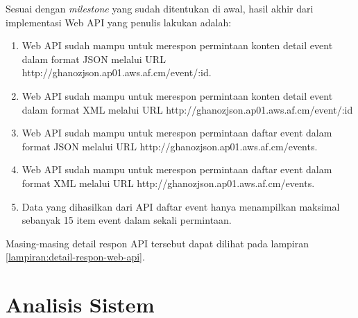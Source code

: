\documentclass[a4paper, 12pt, oneside]{report}
\begin{document}
\onehalfspacing Sesuai dengan \textit{milestone} yang sudah ditentukan di awal, hasil akhir dari implementasi Web API yang penulis lakukan adalah:

\begin{enumerate}
  \item Web API sudah mampu untuk merespon permintaan konten detail event dalam format JSON melalui URL http://ghanozjson.ap01.aws.af.cm/event/:id.
  \item Web API sudah mampu untuk merespon permintaan konten detail event dalam format XML melalui URL http://ghanozjson.ap01.aws.af.cm/event/:id
  \item Web API sudah mampu untuk merespon permintaan daftar event dalam format JSON melalui URL http://ghanozjson.ap01.aws.af.cm/events.
  \item Web API sudah mampu untuk merespon permintaan daftar event dalam format XML melalui URL http://ghanozjson.ap01.aws.af.cm/events.
  \item Data yang dihasilkan dari API daftar event hanya menampilkan maksimal sebanyak 15 item event dalam sekali permintaan.
\end{enumerate}

\onehalfspacing Masing-masing detail respon API tersebut dapat dilihat pada lampiran \ref{lampiran:detail-respon-web-api}.

\chapter{Analisis Sistem}
\end{document}
